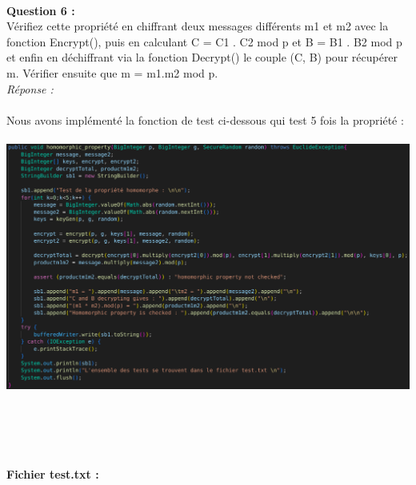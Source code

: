 \documentclass[a4paper,11pt]{article}
\begin{document}
        
        \textbf{\\Question 6 : \\}Vérifiez cette propriété en chiffrant deux messages différents m1 et m2 avec la fonction Encrypt(), puis en calculant C = C1 . C2 mod p et B = B1 . B2 mod p et enfin en déchiffrant via la fonction Decrypt() le couple (C, B) pour récupérer m. Vérifier ensuite que m = m1.m2 mod p.
        \textit{\\Réponse :} \\\\Nous avons implémenté la fonction de test ci-dessous qui test 5 fois la propriété : \\\\\includegraphics[scale=0.3]{assets/homo_prop.png}\\\\\\\

        
        \textbf{\\Fichier test.txt : }
\end{document}
